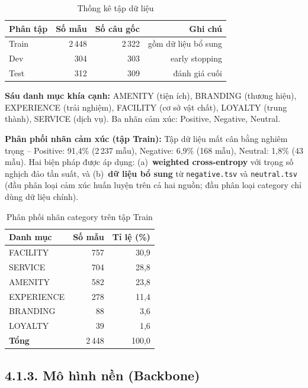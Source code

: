 \begin{table}[H]
\centering
\caption{Thống kê tập dữ liệu}
\label{tab:dataset_stats}
\begin{tabular}{@{}lrrr@{}}
\toprule
\textbf{Phân tập} & \textbf{Số mẫu} & \textbf{Số câu gốc} & \textbf{Ghi chú} \\
\midrule
Train & 2\,448 & 2\,322 & gồm dữ liệu bổ sung \\
Dev   &   304  &   303  & early stopping \\
Test  &   312  &   309  & đánh giá cuối \\
\bottomrule
\end{tabular}
\end{table}

\textbf{Sáu danh mục khía cạnh:} AMENITY (tiện ích), BRANDING
(thương hiệu), EXPERIENCE (trải nghiệm), FACILITY (cơ sở vật chất),
LOYALTY (trung thành), SERVICE (dịch vụ). Ba nhãn cảm xúc: Positive,
Negative, Neutral.

\textbf{Phân phối nhãn cảm xúc (tập Train):} Tập dữ liệu mất cân
bằng nghiêm trọng -- Positive: 91,4\% (2\,237 mẫu), Negative: 6,9\%
(168 mẫu), Neutral: 1,8\% (43 mẫu). Hai biện pháp được áp dụng:
(a)~\textbf{weighted cross-entropy} với trọng số nghịch đảo tần suất,
và (b)~\textbf{dữ liệu bổ sung} từ \texttt{negative.tsv} và
\texttt{neutral.tsv} (đầu phân loại cảm xúc huấn luyện trên cả hai
nguồn; đầu phân loại category chỉ dùng dữ liệu chính).

\begin{table}[H]
\centering
\caption{Phân phối nhãn category trên tập Train}
\label{tab:category}
\begin{tabular}{@{}lrr@{}}
\toprule
\textbf{Danh mục} & \textbf{Số mẫu} & \textbf{Tỉ lệ (\%)} \\
\midrule
FACILITY   & 757 & 30,9 \\
SERVICE    & 704 & 28,8 \\
AMENITY    & 582 & 23,8 \\
EXPERIENCE & 278 & 11,4 \\
BRANDING   &  88 &  3,6 \\
LOYALTY    &  39 &  1,6 \\
\midrule
\textbf{Tổng} & 2\,448 & 100,0 \\
\bottomrule
\end{tabular}
\end{table}

\subsection{4.1.3.\; Mô hình nền (Backbone)}

